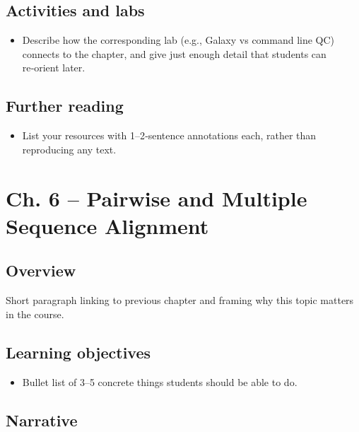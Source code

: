 \documentclass[
  letterpaper,
  DIV=11,
  numbers=noendperiod]{scrreprt}
\providecommand{\tightlist}{%
  \setlength{\itemsep}{0pt}\setlength{\parskip}{0pt}}
\begin{document}
\section{Activities and labs}\label{activities-and-labs-1}

\begin{itemize}
\tightlist
\item
  Describe how the corresponding lab (e.g., Galaxy vs command line QC)
  connects to the chapter, and give just enough detail that students can
  re‑orient later.
\end{itemize}

\section{Further reading}\label{further-reading-1}

\begin{itemize}
\tightlist
\item
  List your resources with 1--2‑sentence annotations each, rather than
  reproducing any text.
\end{itemize}


\chapter{Ch. 6 -- Pairwise and Multiple Sequence
Alignment}\label{ch.-6-pairwise-and-multiple-sequence-alignment}

\section{Overview}\label{overview-2}

Short paragraph linking to previous chapter and framing why this topic
matters in the course.

\section{Learning objectives}\label{learning-objectives-2}

\begin{itemize}
\tightlist
\item
  Bullet list of 3--5 concrete things students should be able to do.
\end{itemize}

\section{Narrative}\label{narrative-2}
\end{document}
